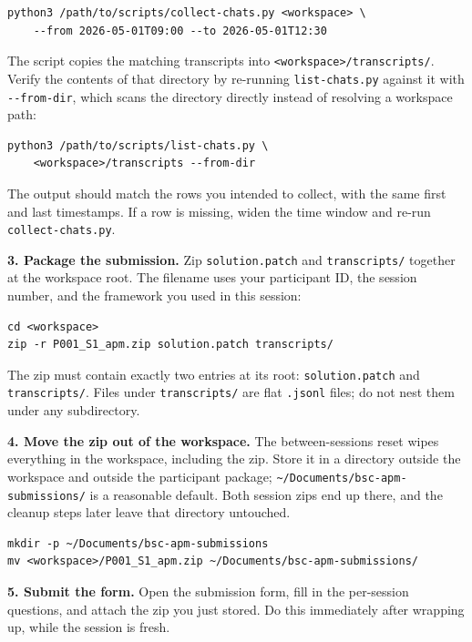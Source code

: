 \documentclass[11pt, a4paper]{article}
\begin{document}
\begin{verbatim}
python3 /path/to/scripts/collect-chats.py <workspace> \
    --from 2026-05-01T09:00 --to 2026-05-01T12:30
\end{verbatim}

The script copies the matching transcripts into \texttt{<workspace>/transcripts/}. Verify the contents of that directory by re-running \texttt{list-chats.py} against it with \texttt{-{}-from-dir}, which scans the directory directly instead of resolving a workspace path:

\begin{verbatim}
python3 /path/to/scripts/list-chats.py \
    <workspace>/transcripts --from-dir
\end{verbatim}

The output should match the rows you intended to collect, with the same first and last timestamps. If a row is missing, widen the time window and re-run \texttt{collect-chats.py}.

\textbf{3. Package the submission.} Zip \texttt{solution.patch} and \texttt{transcripts/} together at the workspace root. The filename uses your participant ID, the session number, and the framework you used in this session:

\begin{verbatim}
cd <workspace>
zip -r P001_S1_apm.zip solution.patch transcripts/
\end{verbatim}

The zip must contain exactly two entries at its root: \texttt{solution.patch} and \texttt{transcripts/}. Files under \texttt{transcripts/} are flat \texttt{.jsonl} files; do not nest them under any subdirectory.

\textbf{4. Move the zip out of the workspace.} The between-sessions reset wipes everything in the workspace, including the zip. Store it in a directory outside the workspace and outside the participant package; \texttt{\textasciitilde/Documents/bsc-apm-submissions/} is a reasonable default. Both session zips end up there, and the cleanup steps later leave that directory untouched.

\begin{verbatim}
mkdir -p ~/Documents/bsc-apm-submissions
mv <workspace>/P001_S1_apm.zip ~/Documents/bsc-apm-submissions/
\end{verbatim}

\textbf{5. Submit the form.} Open the submission form, fill in the per-session questions, and attach the zip you just stored. Do this immediately after wrapping up, while the session is fresh.
\end{document}

